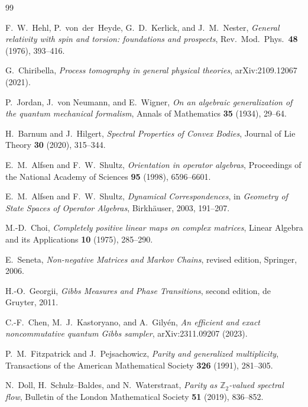 \documentclass[11pt]{article}
\theoremstyle{definition}
\theoremstyle{remark}
\begin{document}
\begin{thebibliography}{99}

F.~W.~Hehl, P.~von~der~Heyde, G.~D.~Kerlick, and J.~M.~Nester,
\emph{General relativity with spin and torsion: foundations and prospects},
Rev.\ Mod.\ Phys.\ \textbf{48} (1976), 393--416.

G.~Chiribella,
\emph{Process tomography in general physical theories},
arXiv:2109.12067 (2021).

P.~Jordan, J.~von Neumann, and E.~Wigner,
\emph{On an algebraic generalization of the quantum mechanical formalism},
Annals of Mathematics \textbf{35} (1934), 29--64.

H.~Barnum and J.~Hilgert,
\emph{Spectral Properties of Convex Bodies},
Journal of Lie Theory \textbf{30} (2020), 315--344.

E.~M.~Alfsen and F.~W.~Shultz,
\emph{Orientation in operator algebras},
Proceedings of the National Academy of Sciences \textbf{95} (1998), 6596--6601.

E.~M.~Alfsen and F.~W.~Shultz,
\emph{Dynamical Correspondences}, in \emph{Geometry of State Spaces of
Operator Algebras}, Birkh\"auser, 2003, 191--207.

M.-D.~Choi,
\emph{Completely positive linear maps on complex matrices},
Linear Algebra and its Applications \textbf{10} (1975), 285--290.

E.~Seneta,
\emph{Non-negative Matrices and Markov Chains}, revised edition,
Springer, 2006.

H.-O.~Georgii,
\emph{Gibbs Measures and Phase Transitions}, second edition,
de Gruyter, 2011.


C.-F.~Chen, M.~J.~Kastoryano, and A.~Gily\'en,
\emph{An efficient and exact noncommutative quantum Gibbs sampler},
arXiv:2311.09207 (2023).


P.~M.~Fitzpatrick and J.~Pejsachowicz,
\emph{Parity and generalized multiplicity},
Transactions of the American Mathematical Society \textbf{326} (1991),
281--305.

N.~Doll, H.~Schulz--Baldes, and N.~Waterstraat,
\emph{Parity as $\mathbb Z_2$-valued spectral flow},
Bulletin of the London Mathematical Society \textbf{51} (2019), 836--852.


\end{thebibliography}
\end{document}
